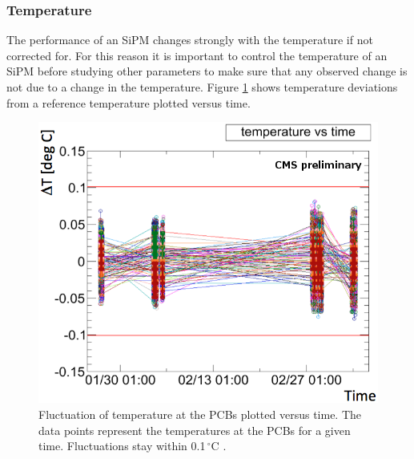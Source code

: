 \subsubsection{Temperature}
The performance of an SiPM changes strongly with the temperature if not corrected for. For this reason it is important to control the temperature of an SiPM before studying other parameters to make sure that any observed change is not due to a change in the temperature. Figure \ref{kuenskentemperatureStability} shows temperature deviations from a reference temperature plotted versus time.
\begin{figure}[htbp]
\centering
\begin{minipage}[t]{0.475\textwidth}
\includegraphics[width=\textwidth]{Figures/kuensken/temperature.png}
\caption{Fluctuation of temperature at the PCBs plotted versus time. The data points represent the temperatures at the PCBs for a given time. Fluctuations stay within 0.1\,$^\circ$C \cite{kuenskenCalor}.}
\label{kuenskentemperatureStability}
\end{minipage}
\hspace{0.5cm}
\begin{minipage}[t]{0.455\textwidth}

\end{minipage}
\end{figure}
